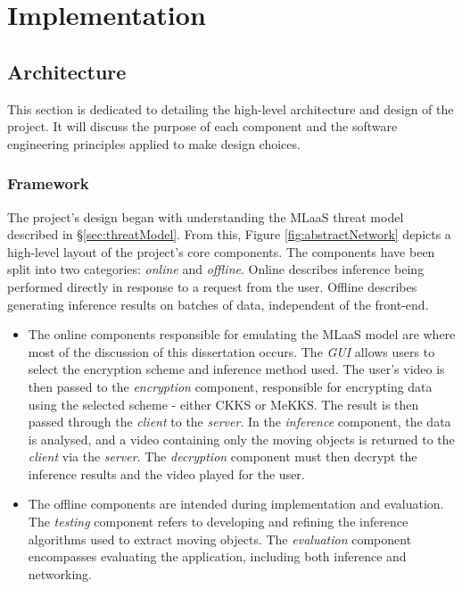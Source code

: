 \chapter{Implementation}
\label{chap:implementation}


\section{Architecture}
\setlength{\leftskip}{0.25cm}
\indent \indent
This section is dedicated to detailing the high-level architecture and design of the project. It will discuss the purpose of each component and the software engineering principles applied to make design choices.

\setlength{\leftskip}{0cm}
\subsection{Framework}
\setlength{\leftskip}{0.5cm}
\indent \indent
The project's design began with understanding the MLaaS threat model described in §\ref{sec:threatModel}. From this, Figure \ref{fig:abstractNetwork} depicts a high-level layout of the project's core components. The components have been split into two categories: \textit{online} and \textit{offline}. Online describes inference being performed directly in response to a request from the user. Offline describes generating inference results on batches of data, independent of the front-end.
\begin{itemize}
    \item The online components responsible for emulating the MLaaS model are where most of the discussion of this dissertation occurs. The \textit{GUI} allows users to select the encryption scheme and inference method used. The user's video is then passed to the \textit{encryption} component, responsible for encrypting data using the selected scheme - either CKKS or MeKKS. The result is then passed through the \textit{client} to the \textit{server}. In the \textit{inference} component, the data is analysed, and a video containing only the moving objects is returned to the \textit{client} via the \textit{server}. The \textit{decryption} component must then decrypt the inference results and the video played for the user.
    \item The offline components are intended during implementation and evaluation. The \textit{testing} component refers to developing and refining the inference algorithms used to extract moving objects. The \textit{evaluation} component encompasses evaluating the application, including both inference and networking.
\end{itemize}
